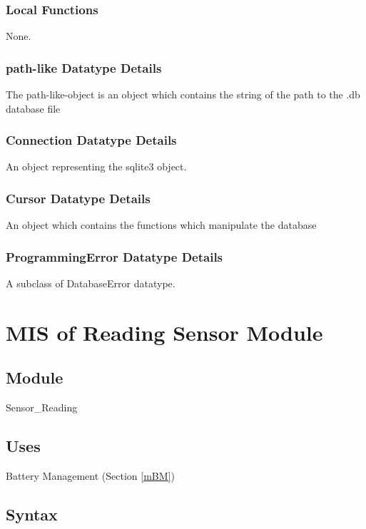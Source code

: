 \documentclass[12pt, titlepage]{article}
\begin{document}
\subsubsection{Local Functions}

None.

\subsubsection{path-like Datatype Details}
The path-like-object is an object which contains the string of the path to the .db database file

\subsubsection{Connection Datatype Details}
An object representing the sqlite3 object.

\subsubsection{Cursor Datatype Details}
An object which contains the functions which manipulate the database

\subsubsection{ProgrammingError Datatype Details}
A subclass of DatabaseError datatype.

\newpage


\section{MIS of Reading Sensor Module} \label{mSA1} 

\subsection{Module}

Sensor\_Reading

\subsection{Uses}

Battery Management (Section \ref{mBM})

\subsection{Syntax}
\end{document}
